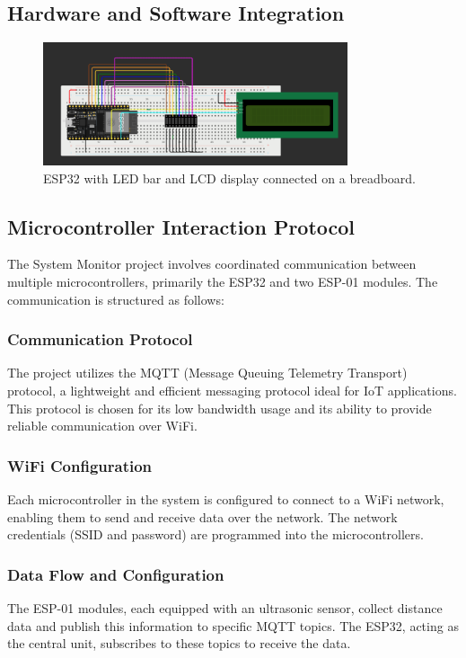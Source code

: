 \documentclass{article}
\begin{document}
\subsection{Hardware and Software Integration}
\begin{figure}[ht]
    \centering
    \includegraphics[width=0.8\textwidth]{../images/activity_monitor_scheme.png}
    \caption{ESP32 with LED bar and LCD display connected on a breadboard.}
    \label{fig:esp32_system_monitor}
\end{figure}

\subsection{Microcontroller Interaction Protocol}
The System Monitor project involves coordinated communication between multiple microcontrollers, primarily the ESP32 and two ESP-01 modules. The communication is structured as follows:

\subsubsection{Communication Protocol}
The project utilizes the MQTT (Message Queuing Telemetry Transport) protocol, a lightweight and efficient messaging protocol ideal for IoT applications. This protocol is chosen for its low bandwidth usage and its ability to provide reliable communication over WiFi.

\subsubsection{WiFi Configuration}
Each microcontroller in the system is configured to connect to a WiFi network, enabling them to send and receive data over the network. The network credentials (SSID and password) are programmed into the microcontrollers.

\subsubsection{Data Flow and Configuration}
The ESP-01 modules, each equipped with an ultrasonic sensor, collect distance data and publish this information to specific MQTT topics. The ESP32, acting as the central unit, subscribes to these topics to receive the data.
\end{document}
